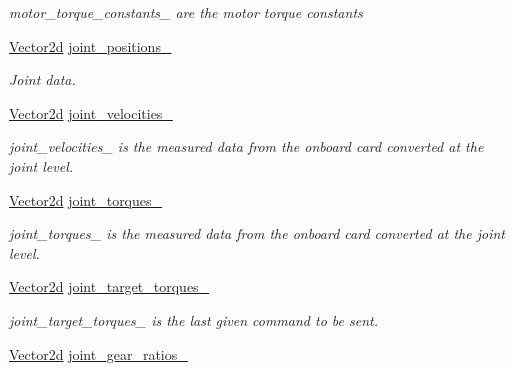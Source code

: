 \begin{DoxyCompactItemize}
\begin{DoxyCompactList}\small\item\em motor\+\_\+torque\+\_\+constants\+\_\+ are the motor torque constants \end{DoxyCompactList}\item 
\hyperlink{common__header_8hpp_acb6916bc8c9fe9d98c484fd4cc201447}{Vector2d} \hyperlink{classblmc__robots_1_1Teststand_a5ff6d1081ece6fadf9b3bac578b08001}{joint\+\_\+positions\+\_\+}
\begin{DoxyCompactList}\small\item\em Joint data. \end{DoxyCompactList}\item 
\hyperlink{common__header_8hpp_acb6916bc8c9fe9d98c484fd4cc201447}{Vector2d} \hyperlink{classblmc__robots_1_1Teststand_ab0a776f921bec24b81bc08f7ceebcba6}{joint\+\_\+velocities\+\_\+}\hypertarget{classblmc__robots_1_1Teststand_ab0a776f921bec24b81bc08f7ceebcba6}{}\label{classblmc__robots_1_1Teststand_ab0a776f921bec24b81bc08f7ceebcba6}

\begin{DoxyCompactList}\small\item\em joint\+\_\+velocities\+\_\+ is the measured data from the onboard card converted at the joint level. \end{DoxyCompactList}\item 
\hyperlink{common__header_8hpp_acb6916bc8c9fe9d98c484fd4cc201447}{Vector2d} \hyperlink{classblmc__robots_1_1Teststand_a59ef3d86efd043ee1511bad70624bdae}{joint\+\_\+torques\+\_\+}\hypertarget{classblmc__robots_1_1Teststand_a59ef3d86efd043ee1511bad70624bdae}{}\label{classblmc__robots_1_1Teststand_a59ef3d86efd043ee1511bad70624bdae}

\begin{DoxyCompactList}\small\item\em joint\+\_\+torques\+\_\+ is the measured data from the onboard card converted at the joint level. \end{DoxyCompactList}\item 
\hyperlink{common__header_8hpp_acb6916bc8c9fe9d98c484fd4cc201447}{Vector2d} \hyperlink{classblmc__robots_1_1Teststand_a0db888b3e84fe194629bb14b6fa2e485}{joint\+\_\+target\+\_\+torques\+\_\+}\hypertarget{classblmc__robots_1_1Teststand_a0db888b3e84fe194629bb14b6fa2e485}{}\label{classblmc__robots_1_1Teststand_a0db888b3e84fe194629bb14b6fa2e485}

\begin{DoxyCompactList}\small\item\em joint\+\_\+target\+\_\+torques\+\_\+ is the last given command to be sent. \end{DoxyCompactList}\item 
\hyperlink{common__header_8hpp_acb6916bc8c9fe9d98c484fd4cc201447}{Vector2d} \hyperlink{classblmc__robots_1_1Teststand_ad7b3b6c032d1b1b9c886089ea21a9c2a}{joint\+\_\+gear\+\_\+ratios\+\_\+}\hypertarget{classblmc__robots_1_1Teststand_ad7b3b6c032d1b1b9c886089ea21a9c2a}{}\label{classblmc__robots_1_1Teststand_ad7b3b6c032d1b1b9c886089ea21a9c2a}


\end{DoxyCompactItemize}
